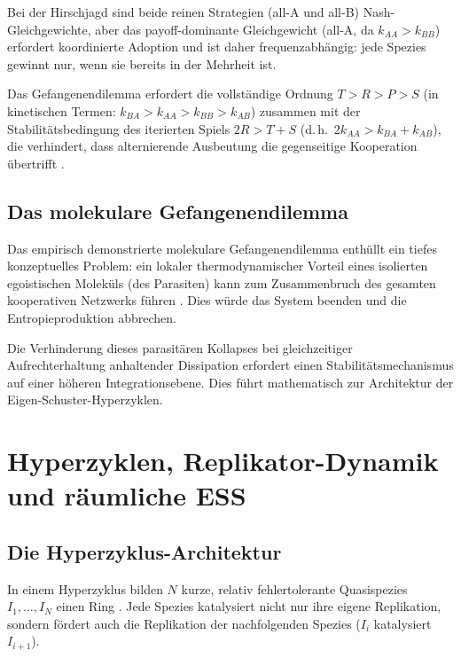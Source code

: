 \documentclass[12pt,a4paper]{article}
\theoremstyle{remark}
\begin{document}
\noindent
Bei der Hirschjagd sind beide reinen Strategien (all-A und all-B) Nash-Gleichgewichte, aber das payoff-dominante Gleichgewicht (all-A, da $k_{AA} > k_{BB}$) erfordert koordinierte Adoption und ist daher frequenzabh\"angig: jede Spezies gewinnt nur, wenn sie bereits in der Mehrheit ist.

Das Gefangenendilemma erfordert die vollst\"andige Ordnung $T > R > P > S$ (in kinetischen Termen: $k_{BA} > k_{AA} > k_{BB} > k_{AB}$) zusammen mit der Stabilit\"atsbedingung des iterierten Spiels $2R > T + S$ (d.\,h.\ $2k_{AA} > k_{BA} + k_{AB}$), die verhindert, dass alternierende Ausbeutung die gegenseitige Kooperation \"ubertrifft \citep{HofbauerSigmund1998}.

\subsection{Das molekulare Gefangenendilemma}

Das empirisch demonstrierte molekulare Gefangenendilemma enth\"ullt ein tiefes konzeptuelles Problem: ein lokaler thermodynamischer Vorteil eines isolierten egoistischen Molek\"uls (des Parasiten) kann zum Zusammenbruch des gesamten kooperativen Netzwerks f\"uhren \citep{AzoarcusPMC}. Dies w\"urde das System beenden und die Entropieproduktion abbrechen.

Die Verhinderung dieses parasit\"aren Kollapses bei gleichzeitiger Aufrechterhaltung anhaltender Dissipation erfordert einen Stabilit\"atsmechanismus auf einer h\"oheren Integrationsebene. Dies f\"uhrt mathematisch zur Architektur der Eigen-Schuster-Hyperzyklen.

\section{Hyperzyklen, Replikator-Dynamik und r\"aumliche ESS}
\label{sec:hypercycles}

\subsection{Die Hyperzyklus-Architektur}

In einem Hyperzyklus bilden $N$ kurze, relativ fehlertolerante Quasispezies $I_1, \ldots, I_N$ einen Ring \citep{Eigen1979}. Jede Spezies katalysiert nicht nur ihre eigene Replikation, sondern f\"ordert auch die Replikation der nachfolgenden Spezies ($I_i$ katalysiert $I_{i+1}$).
\end{document}
